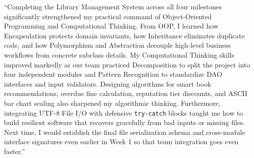 \documentclass[12pt,a4paper]{article}
\begin{document}
``Completing the Library Management System across all four milestones significantly strengthened my practical command of Object-Oriented Programming and Computational Thinking. From OOP, I learned how Encapsulation protects domain invariants, how Inheritance eliminates duplicate code, and how Polymorphism and Abstraction decouple high-level business workflows from concrete subclass details. My Computational Thinking skills improved markedly as our team practiced Decomposition to split the project into four independent modules and Pattern Recognition to standardize DAO interfaces and input validators. Designing algorithms for smart book recommendations, overdue fine calculation, reputation tier discounts, and ASCII bar chart scaling also sharpened my algorithmic thinking. Furthermore, integrating UTF-8 File I/O with defensive \texttt{try-catch} blocks taught me how to build resilient software that recovers gracefully from bad inputs or missing files. Next time, I would establish the final file serialization schema and cross-module interface signatures even earlier in Week 1 so that team integration goes even faster.''
\end{document}
